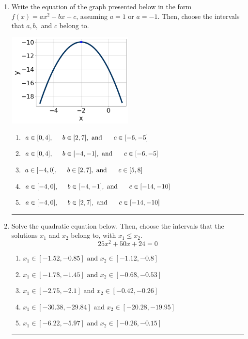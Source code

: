 \documentclass[14pt]{extbook}
\newcommand{\litem}[1]{\item#1\hspace*{-1cm}\rule{\textwidth}{0.4pt}}
\begin{document}
\begin{enumerate}
{\begin{enumerate}[label=\Alph*.]
\end{enumerate} }
\litem{
Write the equation of the graph presented below in the form $f(x)=ax^2+bx+c$, assuming  $a=1$ or $a=-1$. Then, choose the intervals that $a, b,$ and $c$ belong to.
\begin{center}
    \includegraphics[width=0.5\textwidth]{../Figures/quadraticGraphToEquationA.png}
\end{center}
\begin{enumerate}[label=\Alph*.]
\item \( a \in [0, 4], \hspace*{5mm} b \in [2, 7], \text{ and } \hspace*{5mm} c \in [-6, -5] \)
\item \( a \in [0, 4], \hspace*{5mm} b \in [-4, -1], \text{ and } \hspace*{5mm} c \in [-6, -5] \)
\item \( a \in [-4, 0], \hspace*{5mm} b \in [2, 7], \text{ and } \hspace*{5mm} c \in [5, 8] \)
\item \( a \in [-4, 0], \hspace*{5mm} b \in [-4, -1], \text{ and } \hspace*{5mm} c \in [-14, -10] \)
\item \( a \in [-4, 0], \hspace*{5mm} b \in [2, 7], \text{ and } \hspace*{5mm} c \in [-14, -10] \)

\end{enumerate} }
\litem{
Solve the quadratic equation below. Then, choose the intervals that the solutions $x_1$ and $x_2$ belong to, with $x_1 \leq x_2$.\[ 25x^{2} +50 x + 24 = 0 \]\begin{enumerate}[label=\Alph*.]
\item \( x_1 \in [-1.52, -0.85] \text{ and } x_2 \in [-1.12, -0.8] \)
\item \( x_1 \in [-1.78, -1.45] \text{ and } x_2 \in [-0.68, -0.53] \)
\item \( x_1 \in [-2.75, -2.1] \text{ and } x_2 \in [-0.42, -0.26] \)
\item \( x_1 \in [-30.38, -29.84] \text{ and } x_2 \in [-20.28, -19.95] \)
\item \( x_1 \in [-6.22, -5.97] \text{ and } x_2 \in [-0.26, -0.15] \)


\end{enumerate}}
\end{enumerate}
\end{document}
